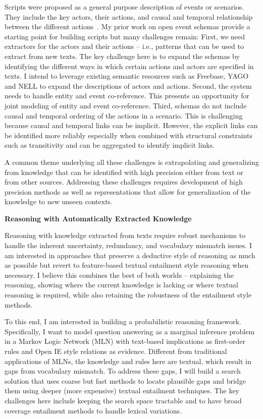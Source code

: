 \documentclass[a4paper,11pt,onecolumn]{article}
\begin{document}
Scripts were proposed as a general purpose description of events or scenarios. They include the key actors, their actions, and causal and temporal relationship between the different actions~\cite{schank-scripts75}. My prior work on open event schemas provide a starting point for building scripts but many challenges remain: First, we need extractors for the actors and their actions -- i.e., patterns that can be used to extract from new texts. The key challenge here is to expand the schemas by identifying the different ways in which certain actions and actors are specified in texts. I intend to leverage existing semantic resources such as Freebase, YAGO and NELL to expand the descriptions of actors and actions. Second, the system needs to handle entity and event co-reference. This presents an opportunity for joint modeling of entity and event co-reference. Third, schemas do not include causal and temporal ordering of the actions in a scenario. This is challenging because causal and temporal links can be implicit. However, the explicit links can be identified more reliably especially when combined with structural constraints such as transitivity and can be aggregated to identify implicit links.

A common theme underlying all these challenges is extrapolating and generalizing from knowledge that can be identified with high precision either from text or from other sources.  Addressing these challenges requires development of high precision methods as well as representations that allow for generalization of the knowledge to new unseen contexts. 


{\bf Reasoning with Automatically Extracted Knowledge}

Reasoning with knowledge extracted from texts require robust mechanisms to handle the inherent uncertainty, redundancy, and vocabulary mismatch issues. I am interested in approaches that preserve a deductive style of reasoning as much as possible but revert to feature-based textual entailment style reasoning when necessary. I believe this combines the best of both worlds -- explaining the reasoning, showing where the current knowledge is lacking or where textual reasoning is required, while also retaining the robustness of the entailment style methods. 

To this end, I am interested in building a probabilistic reasoning framework. Specifically, I want to model question answering as a marginal inference problem in a Markov Logic Network (MLN) with text-based implications as first-order rules and Open IE style relations as evidence. Different from traditional applications of MLNs, the knowledge and rules here are textual, which result in gaps from vocabulary mismatch. To address these gaps, I will build a search solution that uses coarse but fast methods to locate plausible gaps and bridge them using deeper (more expensive) textual entailment techniques. The key challenges here include keeping the search space tractable and to have broad coverage entailment methods to handle lexical variations. 
\end{document}
